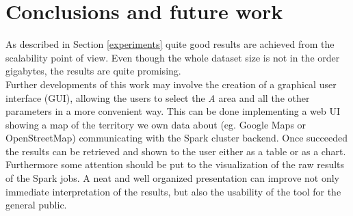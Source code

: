 \documentclass{sig-alternate-05-2015}
\begin{document}
\section{Conclusions and future work}
As described in Section \ref{experiments} quite good results are achieved from the scalability point of view. Even though the whole dataset size is not in the order gigabytes, the results are quite promising.\\
Further developments of this work may involve the creation of a graphical user interface (GUI), allowing the users to select the \emph{A} area and all the other parameters in a more convenient way. This can be done implementing a web UI showing a map of the territory we own data about (eg. Google Maps or OpenStreetMap) communicating with the Spark cluster backend. Once succeeded the results can be retrieved and shown to the user either as a table or as a chart.\\
Furthermore some attention should be put to the visualization of the raw results of the Spark jobs. A neat and well organized presentation can improve not only immediate interpretation of the results, but also the usability of the tool for the general public.


%



%
%
\end{document}
